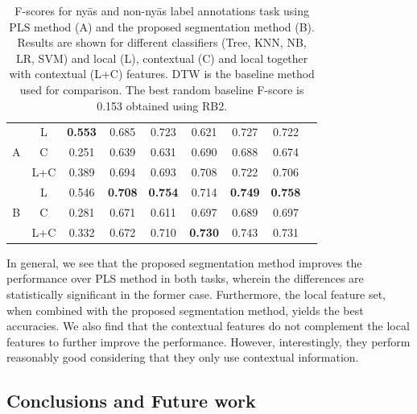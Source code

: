 {\begin{table}
\begin{tabular}{ c|c|c | c  c  c  c  c  c }
		\multirow{3}{*}{A} &   L		& \textbf{0.553} & 0.685 & 0.723 & 0.621 & 0.727 & 0.722	\\
		&	C   		& 0.251 & 0.639 & 0.631  & 0.690 & 0.688 & 0.674	\\
		& 	L+C		& 0.389 & 0.694 & 0.693 & 0.708 & 0.722 & 0.706	\\	
		\hline
		\multirow{3}{*}{B} & 	L		& 0.546 & \textbf{0.708} & \textbf{0.754} & 0.714 & \textbf{0.749} & \textbf{0.758} \\
		& 	C		&0.281 & 0.671 & 0.611 & 0.697 & 0.689 & 0.697\\
		& 	L+C		& 0.332 & 0.672 & 0.710 & \textbf{0.730} & 0.743 & 0.731\\
		\hline\hline        
	\end{tabular}
	\caption{F-scores for ny\={a}s and non-ny\={a}s label annotations task using PLS method (A) and the proposed segmentation method (B). Results are shown for different classifiers (Tree, KNN, NB, LR, SVM) and local (L), contextual (C) and local together with contextual (L+C) features. DTW is the baseline method used for comparison. The best random baseline F-score is  0.153 obtained using RB2. } 
	\label{tab:accuraciesRegion}
\end{table}


In general, we see that the proposed segmentation method improves the performance over PLS method in both tasks, wherein the differences are statistically significant in the former case. Furthermore, the local feature set, when combined with the proposed segmentation method, yields the best accuracies. We also find that the contextual features do not complement the local features to further improve the performance. However, interestingly, they perform reasonably good considering that they only use contextual information.


\subsection{Conclusions and Future work}
\label{ConclusionAndFutureWork}

}
